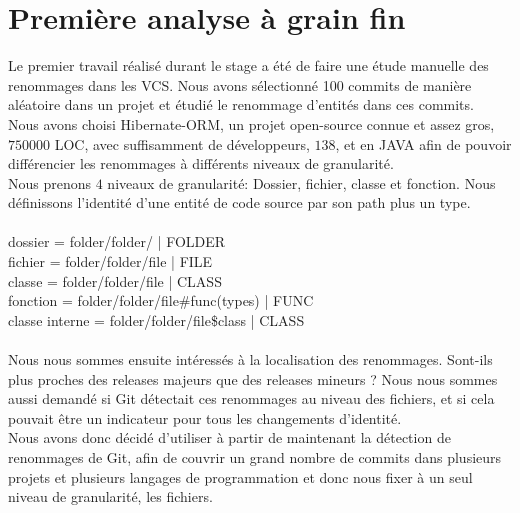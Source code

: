 \section{Première analyse à grain fin}
\label{sec:analyse_fin_grain}

Le premier travail réalisé durant le stage a été de faire une étude manuelle des renommages dans les VCS. Nous avons sélectionné 100 commits de manière aléatoire dans un projet et étudié le renommage d'entités dans ces commits.\\
Nous avons choisi Hibernate-ORM, un projet open-source connue et assez gros, $750000$ LOC, avec suffisamment de développeurs, $138$, et en JAVA afin de pouvoir différencier les renommages à différents niveaux de granularité.\\
Nous prenons $4$ niveaux de granularité: Dossier, fichier, classe et fonction. Nous définissons l'identité d'une entité de code source par son path plus un type. \\\\
dossier = folder/folder/ | FOLDER\\
fichier = folder/folder/file | FILE\\
classe = folder/folder/file | CLASS\\
fonction = folder/folder/file\#func(types) | FUNC\\
classe interne = folder/folder/file\$class | CLASS\\\\
Nous nous sommes ensuite intéressés à la localisation des renommages. Sont-ils plus proches des releases majeurs que des releases mineurs ? Nous nous sommes aussi demandé si Git détectait ces renommages au niveau des fichiers, et si cela pouvait être un indicateur pour tous les changements d'identité.\\
Nous avons donc décidé d'utiliser à partir de maintenant la détection de renommages de Git, afin de couvrir un grand nombre de commits dans plusieurs projets et plusieurs langages de programmation et donc nous fixer à un seul niveau de granularité, les fichiers.\\
